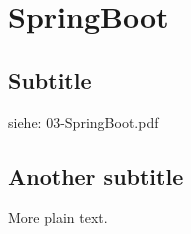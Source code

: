 \section{SpringBoot}

\subsection{Subtitle}

siehe: 03-SpringBoot.pdf

\subsection{Another subtitle}

More plain text.
